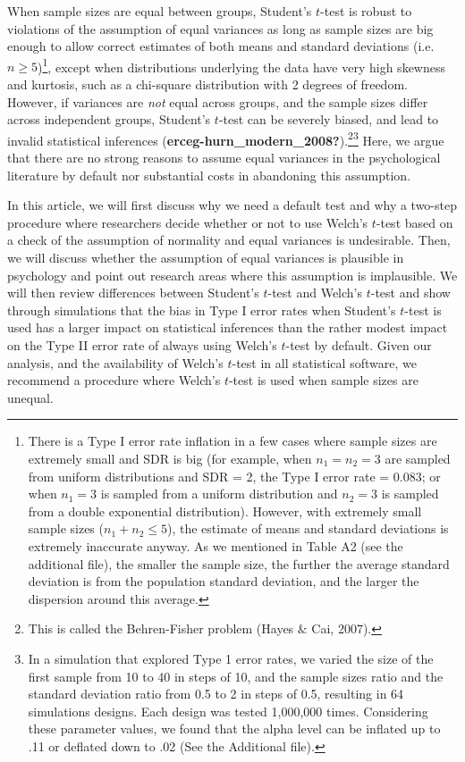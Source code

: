 \documentclass[
  english,
  man]{apa6}
\begin{document}
When sample sizes are equal between groups, Student's \(t\)-test is robust to violations of the assumption of equal variances as long as sample sizes are big enough to allow correct estimates of both means and standard deviations (i.e.~\(n \ge 5\))\footnote{There is a Type I error rate inflation in a few cases where sample sizes are extremely small and SDR is big (for example, when \(n_1 = n_2 = 3\) are sampled from uniform distributions and SDR = 2, the Type I error rate = 0.083; or when \(n_1 = 3\) is sampled from a uniform distribution and \(n_2 = 3\) is sampled from a double exponential distribution). However, with extremely small sample sizes (\(n_1+n_2 \le 5\)), the estimate of means and standard deviations is extremely inaccurate anyway. As we mentioned in Table A2 (see the additional file), the smaller the sample size, the further the average standard deviation is from the population standard deviation, and the larger the dispersion around this average.}, except when distributions underlying the data have very high skewness and kurtosis, such as a chi-square distribution with 2 degrees of freedom. However, if variances are \emph{not} equal across groups, and the sample sizes differ across independent groups, Student's \(t\)-test can be severely biased, and lead to invalid statistical inferences (\textbf{erceg-hurn\_modern\_2008?}).\footnote{This is called the Behren-Fisher problem  (Hayes $\&$ Cai, 2007).}\footnote{In a simulation that explored Type 1 error rates, we varied the size of the first sample from 10 to 40 in steps of 10, and the sample sizes ratio and the standard deviation ratio from 0.5 to 2 in steps of 0.5, resulting in 64 simulations designs. Each design was tested 1,000,000 times. Considering these parameter values, we found that the alpha level can be inflated up to .11 or deflated down to .02 (See the Additional file).} Here, we argue that there are no strong reasons to assume equal variances in the psychological literature by default nor substantial costs in abandoning this assumption.

In this article, we will first discuss why we need a default test and why a two-step procedure where researchers decide whether or not to use Welch's \(t\)-test based on a check of the assumption of normality and equal variances is undesirable. Then, we will discuss whether the assumption of equal variances is plausible in psychology and point out research areas where this assumption is implausible. We will then review differences between Student's \(t\)-test and Welch's \(t\)-test and show through simulations that the bias in Type I error rates when Student's \(t\)-test is used has a larger impact on statistical inferences than the rather modest impact on the Type II error rate of always using Welch's \(t\)-test by default. Given our analysis, and the availability of Welch's \(t\)-test in all statistical software, we recommend a procedure where Welch's \(t\)-test is used when sample sizes are unequal.
\end{document}
